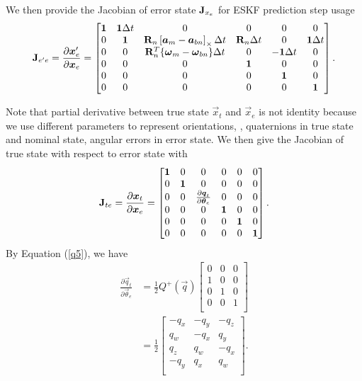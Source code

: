 We then provide the Jacobian of error state $\mathbf{J}_{x_e}$ for ESKF prediction step usage
\begin{equation}\label{f14}
	\mathbf{J}_{e^\prime e} = \frac{\partial{\boldsymbol{x}_e^{\prime}}}{\partial{\boldsymbol{x}_e }} = \begin{bmatrix}
	\mathbf{1} & \mathbf{1}\Delta{t} & 0 & 0 & 0 & 0 \\
	0 & \mathbf{1} & \mathbf{R}_n \left[ \boldsymbol{a}_m - \boldsymbol{a}_{bn} \right]_{\times}\Delta{t} & \mathbf{R}_n\Delta{t} & 0 & \mathbf{1}\Delta{t} \\
	0 & 0 & \mathbf{R}_n^T \{ \boldsymbol{\omega}_m - \boldsymbol{\omega}_{bn} \}\Delta{t} & 0 & -\mathbf{1}\Delta{t} & 0 \\
	0 & 0 & 0 & \mathbf{1} & 0 & 0 \\
	0 & 0 & 0 & 0 & \mathbf{1} & 0 \\
	0 & 0 & 0 & 0 & 0 & \mathbf{1} \\
	\end{bmatrix}.
\end{equation}

Note that partial derivative between true state $\vec{x}_t$ and $\vec{x}_e$ is not identity because we use different parameters to represent orientations, \eg,  quaternions in true state and nominal state, angular errors in error state. We then give the Jacobian of true state with respect to error state with
\begin{equation}\label{f15}
	\mathbf{J}_{t e} = \frac{\partial{\boldsymbol{x}_t}}{\partial{\boldsymbol{x}_e }} = \begin{bmatrix}
	\mathbf{1} & 0 & 0 & 0 & 0 & 0 \\
	0 & \mathbf{1} &0 & 0 & 0 & 0 \\
	0 & 0 & \frac{\partial{\boldsymbol{q}_t}}{\partial{\boldsymbol{\theta}_e }} & 0 & 0 & 0 \\
	0 & 0 & 0 & \mathbf{1} & 0 & 0 \\
	0 & 0 & 0 & 0 & \mathbf{1} & 0 \\
	0 & 0 & 0 & 0 & 0 & \mathbf{1} \\
	\end{bmatrix}.
\end{equation}
By Equation (\ref{q5}), we have
\begin{align}\label{f16}
	\frac{\partial{\vec{q}_t}}{\partial{\vec{\theta}_e }} &= \frac{1}{2}Q^+(\vec{q})\begin{bmatrix}
	0 & 0 & 0 \\
	1 & 0 & 0 \\
	0 & 1 & 0 \\
	0 & 0 & 1 \\
	\end{bmatrix} \\
	&= \frac{1}{2}\begin{bmatrix}
	-q_x & -q_y & -q_z \\
	q_w & -q_x & q_y \\
	q_z & q_w & -q_x \\
	-q_y & q_x & q_w \\
	\end{bmatrix}. 
\end{align}

